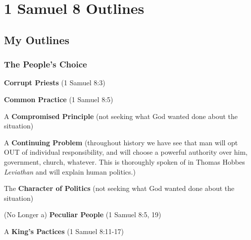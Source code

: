 \section{1 Samuel 8 Outlines}


\subsection{My Outlines}

\subsubsection{The People's Choice}
\begin{compactenum}[I.]
    \item \textbf{Corrupt Priests} (1 Samuel 8:3) 
    \item \textbf{Common Practice} (1 Samuel 8:5) 
    \item A \textbf{Compromised Principle} (not seeking what God wanted done about the situation)%
    \item A \textbf{Continuing Problem} (throughout history we have see that man will opt OUT of individual responsibility, and will choose a powerful authority over him, government, church, whatever. This is thoroughly spoken of in Thomas Hobbes \emph{Leviathan} and will explain human politics.)%
    \item The \textbf{Character of Politics} (not seeking what God wanted done about the situation)%
    \item (No Longer a) \textbf{Peculiar People} (1 Samuel 8:5, 19) 
    \item A \textbf{King's Pactices} (1 Samuel 8:11-17) 
\end{compactenum}

